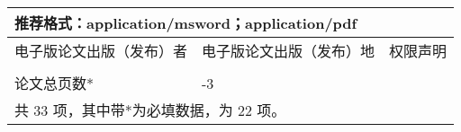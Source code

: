 \begin{table}[htbp]
{\begin{tabularx}{1.1\textwidth}{|X|X|X|X|X|}
\multicolumn{5}{|l|}{推荐格式：application/msword；application/pdf} \\
\midrule
\multicolumn{2}{|l|}{电子版论文出版（发布）者  } & \multicolumn{2}{|l|}{电子版论文出版（发布）地  } & 权限声明\\ \hline
\multicolumn{2}{|l|}{} & \multicolumn{2}{|l|}{} & \\
\midrule
论文总页数* & \multicolumn{4}{|l|}{\pageref{LastPage}-3} \\ \hline
\multicolumn{5}{|l|}{共 33 项，其中带*为必填数据，为 22 项。} \\
\bottomrule
\end{tabularx}}
\end{table}

